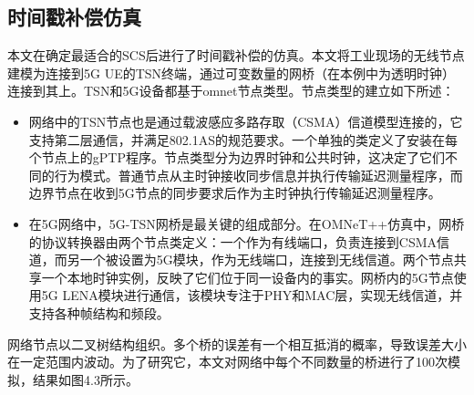 \documentclass[UTF8,a4paper,12pt]{ctexart}
\numberwithin{equation}{section}
\begin{document}
\subsection{时间戳补偿仿真}
本文在确定最适合的SCS后进行了时间戳补偿的仿真。本文将工业现场的无线节点建模为连接到5G UE的TSN终端，通过可变数量的网桥（在本例中为透明时钟）连接到其上。TSN和5G设备都基于omnet节点类型。节点类型的建立如下所述：
\begin{itemize}
	\item 网络中的TSN节点也是通过载波感应多路存取（CSMA）信道模型连接的，它支持第二层通信，并满足802.1AS的规范要求。一个单独的类定义了安装在每个节点上的gPTP程序。节点类型分为边界时钟和公共时钟，这决定了它们不同的行为模式。普通节点从主时钟接收同步信息并执行传输延迟测量程序，而边界节点在收到5G节点的同步要求后作为主时钟执行传输延迟测量程序。
	\item 在5G网络中，5G-TSN网桥是最关键的组成部分。在OMNeT++仿真中，网桥的协议转换器由两个节点类定义：一个作为有线端口，负责连接到CSMA信道，而另一个被设置为5G模块，作为无线端口，连接到无线信道。两个节点共享一个本地时钟实例，反映了它们位于同一设备内的事实。网桥内的5G节点使用5G LENA模块进行通信，该模块专注于PHY和MAC层，实现无线信道，并支持各种帧结构和频段。
\end{itemize}
网络节点以二叉树结构组织。多个桥的误差有一个相互抵消的概率，导致误差大小在一定范围内波动。为了研究它，本文对网络中每个不同数量的桥进行了100次模拟，结果如图4.3所示。
\begin{figure}[htb] 
\end{figure}
\end{document}
